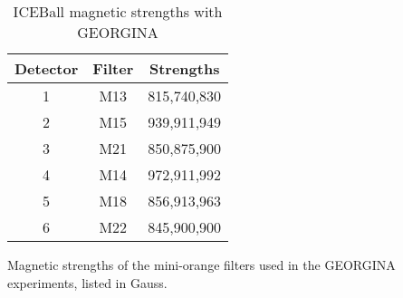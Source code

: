 \begin{table}[]
    \centering
    \caption{ICEBall magnetic strengths with GEORGINA}
    \begin{tabular}{c|c|c} \toprule
         Detector & Filter & Strengths \\
         \hline
         1 & M13 & 815,740,830 \\ 
         2 & M15 & 939,911,949\\
         3 & M21 & 850,875,900 \\
         4 & M14 & 972,911,992\\
         5 & M18 & 856,913,963\\
         6 & M22 & 845,900,900\\ \bottomrule
    \end{tabular}
    \footnotesize
    \item{Magnetic strengths of the mini-orange filters used in the GEORGINA experiments, listed in Gauss. }
    \label{tab:ICE_Magnet_G}
\end{table}